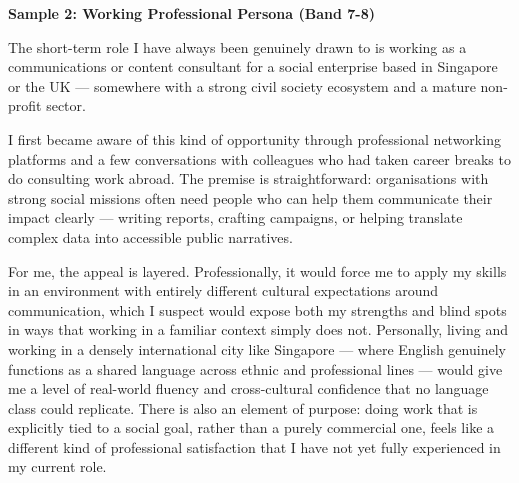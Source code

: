 \begin{ieltsanswer}
\textbf{Sample 2: Working Professional Persona (Band 7-8)}

The short-term role I have always been genuinely drawn to is working as a communications or content consultant for a social enterprise based in Singapore or the UK — somewhere with a strong civil society ecosystem and a mature non-profit sector.

I first became aware of this kind of opportunity through professional networking platforms and a few conversations with colleagues who had taken career breaks to do consulting work abroad. The premise is straightforward: organisations with strong social missions often need people who can help them communicate their impact clearly — writing reports, crafting campaigns, or helping translate complex data into accessible public narratives.

For me, the appeal is layered. Professionally, it would force me to apply my skills in an environment with entirely different cultural expectations around communication, which I suspect would expose both my strengths and blind spots in ways that working in a familiar context simply does not. Personally, living and working in a densely international city like Singapore — where English genuinely functions as a shared language across ethnic and professional lines — would give me a level of real-world fluency and cross-cultural confidence that no language class could replicate. There is also an element of purpose: doing work that is explicitly tied to a social goal, rather than a purely commercial one, feels like a different kind of professional satisfaction that I have not yet fully experienced in my current role.
\end{ieltsanswer}


